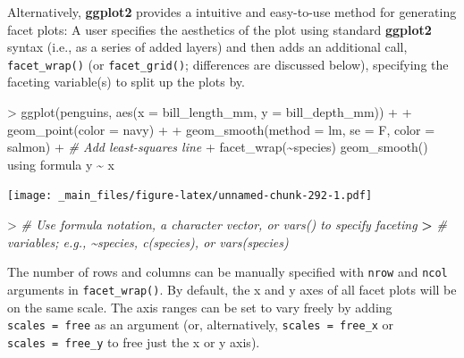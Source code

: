 \documentclass[
]{book}
\newenvironment{Shaded}{\begin{snugshade}}{\end{snugshade}}
\newcommand{\AttributeTok}[1]{\textcolor[rgb]{0.77,0.63,0.00}{#1}}
\newcommand{\CommentTok}[1]{\textcolor[rgb]{0.56,0.35,0.01}{\textit{#1}}}
\newcommand{\ErrorTok}[1]{\textcolor[rgb]{0.64,0.00,0.00}{\textbf{#1}}}
\newcommand{\FunctionTok}[1]{\textcolor[rgb]{0.00,0.00,0.00}{#1}}
\newcommand{\NormalTok}[1]{#1}
\newcommand{\SpecialCharTok}[1]{\textcolor[rgb]{0.00,0.00,0.00}{#1}}
\newcommand{\StringTok}[1]{\textcolor[rgb]{0.31,0.60,0.02}{#1}}
\begin{document}
Alternatively, \textbf{ggplot2} provides a intuitive and easy-to-use method for generating facet plots: A user specifies the aesthetics of the plot using standard \textbf{ggplot2} syntax (i.e., as a series of added layers) and then adds an additional call, \texttt{facet\_wrap()} (or \texttt{facet\_grid()}; differences are discussed below), specifying the faceting variable(s) to split up the plots by.

\begin{Shaded}
\begin{Highlighting}[]
\SpecialCharTok{\textgreater{}} \FunctionTok{ggplot}\NormalTok{(penguins, }\FunctionTok{aes}\NormalTok{(}\AttributeTok{x =}\NormalTok{ bill\_length\_mm, }\AttributeTok{y =}\NormalTok{ bill\_depth\_mm)) }\SpecialCharTok{+}
\SpecialCharTok{+}   \FunctionTok{geom\_point}\NormalTok{(}\AttributeTok{color =} \StringTok{\textquotesingle{}navy\textquotesingle{}}\NormalTok{) }\SpecialCharTok{+}
\SpecialCharTok{+}   \FunctionTok{geom\_smooth}\NormalTok{(}\AttributeTok{method =} \StringTok{\textquotesingle{}lm\textquotesingle{}}\NormalTok{, }\AttributeTok{se =}\NormalTok{ F, }\AttributeTok{color =} \StringTok{\textquotesingle{}salmon\textquotesingle{}}\NormalTok{) }\SpecialCharTok{+} \CommentTok{\# Add least{-}squares line}
\SpecialCharTok{+}   \FunctionTok{facet\_wrap}\NormalTok{(}\SpecialCharTok{\textasciitilde{}}\NormalTok{species)}
\StringTok{\textasciigrave{}}\AttributeTok{geom\_smooth()}\StringTok{\textasciigrave{}}\NormalTok{ using formula }\StringTok{\textquotesingle{}y \textasciitilde{} x\textquotesingle{}}
\end{Highlighting}
\end{Shaded}

\texttt{[image: \_main\_files/figure-latex/unnamed-chunk-292-1.pdf]}

\begin{Shaded}
\begin{Highlighting}[]
\SpecialCharTok{\textgreater{}} \CommentTok{\# Use formula notation, a character vector, or vars() to specify faceting}
\ErrorTok{\textgreater{}} \CommentTok{\# variables; e.g., \textasciitilde{}species, c(\textquotesingle{}species\textquotesingle{}), or vars(species)}
\end{Highlighting}
\end{Shaded}

The number of rows and columns can be manually specified with \texttt{nrow} and \texttt{ncol} arguments in \texttt{facet\_wrap()}. By default, the x and y axes of all facet plots will be on the same scale. The axis ranges can be set to vary freely by adding \texttt{scales\ =\ \textquotesingle{}free\textquotesingle{}} as an argument (or, alternatively, \texttt{scales\ =\ \textquotesingle{}free\_x\textquotesingle{}} or \texttt{scales\ =\ \textquotesingle{}free\_y\textquotesingle{}} to free just the x or y axis).
\end{document}
